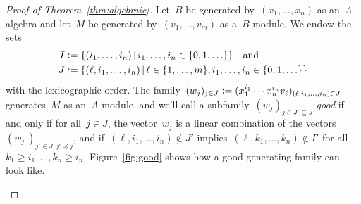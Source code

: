 \documentclass{amsart}
\theoremstyle{definition}
\theoremstyle{plain}
\theoremstyle{remark}
\newcommand{\defeq}{\vcentcolon=}
\begin{document}
\begin{proof}[Proof of Theorem~\ref{thm:algebraic}]
Let~$B$ be generated by~$(x_1,\ldots,x_n)$ as an~$A$-algebra and
let~$M$ be generated by~$(v_1,\ldots,v_m)$ as a~$B$-module. We endow the sets
\begin{align*}
  I &\defeq \{ (i_1,\ldots,i_n) \,|\, i_1,\ldots,i_n \in \{ 0,1,\ldots \} \}
  \quad\text{and} \\
  J &\defeq \{ (\ell, i_1,\ldots,i_n) \,|\, \ell \in \{ 1,\ldots,m \}, i_1,\ldots,i_n \in \{ 0,1,\ldots \} \}
\end{align*}
with the lexicographic order. The family~$(w_j)_{j \in J} \defeq (x_1^{i_1}
\cdots x_n^{i_n} v_\ell)_{(\ell,i_1,\ldots,i_n) \in J}$ generates~$M$ as
an~$A$-module, and we'll call a subfamily~$(w_j)_{j \in J' \subseteq J}$
\emph{good} if and only if for all~$j \in J$, the vector~$w_j$ is a linear
combination of the vectors~$(w_{j'})_{j' \in J, j' \preceq j}$,
and if~$(\ell,i_1,\ldots,i_n) \not\in J'$ implies~$(\ell,k_1,\ldots,k_n) \not\in
I'$ for all~$k_1 \geq i_1, \ldots, k_n \geq i_n$. Figure~\ref{fig:good} shows
how a good generating family can look like.

\begin{figure}[b]
\end{figure}
\end{proof}
\end{document}
